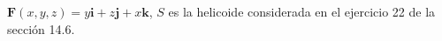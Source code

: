 \item $\mathbf{F}(x, y, z) = y \mathbf{i} + z \mathbf{j} + x \mathbf{k}$, $S$ es la helicoide considerada en el ejercicio 22 de la sección 14.6.
